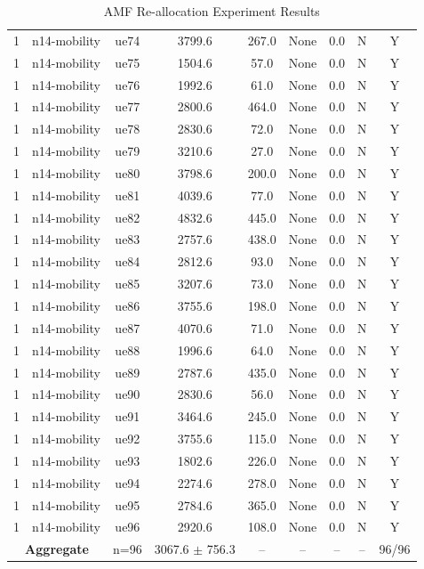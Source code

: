 \begin{table}[ht]
\begin{tabular}{|c|c|c|c|c|c|c|c|c|}
1 & n14-mobility & ue74 & 3799.6 & 267.0 & None & 0.0 & N & Y \\
1 & n14-mobility & ue75 & 1504.6 & 57.0 & None & 0.0 & N & Y \\
1 & n14-mobility & ue76 & 1992.6 & 61.0 & None & 0.0 & N & Y \\
1 & n14-mobility & ue77 & 2800.6 & 464.0 & None & 0.0 & N & Y \\
1 & n14-mobility & ue78 & 2830.6 & 72.0 & None & 0.0 & N & Y \\
1 & n14-mobility & ue79 & 3210.6 & 27.0 & None & 0.0 & N & Y \\
1 & n14-mobility & ue80 & 3798.6 & 200.0 & None & 0.0 & N & Y \\
1 & n14-mobility & ue81 & 4039.6 & 77.0 & None & 0.0 & N & Y \\
1 & n14-mobility & ue82 & 4832.6 & 445.0 & None & 0.0 & N & Y \\
1 & n14-mobility & ue83 & 2757.6 & 438.0 & None & 0.0 & N & Y \\
1 & n14-mobility & ue84 & 2812.6 & 93.0 & None & 0.0 & N & Y \\
1 & n14-mobility & ue85 & 3207.6 & 73.0 & None & 0.0 & N & Y \\
1 & n14-mobility & ue86 & 3755.6 & 198.0 & None & 0.0 & N & Y \\
1 & n14-mobility & ue87 & 4070.6 & 71.0 & None & 0.0 & N & Y \\
1 & n14-mobility & ue88 & 1996.6 & 64.0 & None & 0.0 & N & Y \\
1 & n14-mobility & ue89 & 2787.6 & 435.0 & None & 0.0 & N & Y \\
1 & n14-mobility & ue90 & 2830.6 & 56.0 & None & 0.0 & N & Y \\
1 & n14-mobility & ue91 & 3464.6 & 245.0 & None & 0.0 & N & Y \\
1 & n14-mobility & ue92 & 3755.6 & 115.0 & None & 0.0 & N & Y \\
1 & n14-mobility & ue93 & 1802.6 & 226.0 & None & 0.0 & N & Y \\
1 & n14-mobility & ue94 & 2274.6 & 278.0 & None & 0.0 & N & Y \\
1 & n14-mobility & ue95 & 2784.6 & 365.0 & None & 0.0 & N & Y \\
1 & n14-mobility & ue96 & 2920.6 & 108.0 & None & 0.0 & N & Y \\
\multicolumn{2}{|c|}{\textbf{Aggregate}} & n=96 & 3067.6 $\pm$ 756.3 & -- & -- & -- & -- & 96/96 \\
\hline
\end{tabular}
\caption{AMF Re-allocation Experiment Results}
\label{tab:amf_realloc}
\end{table}
